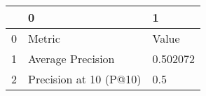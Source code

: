 \begin{tabular}{lll}
\toprule
{} &                       0 &         1 \\
\midrule
0 &                  Metric &     Value \\
1 &       Average Precision &  0.502072 \\
2 &  Precision at 10 (P@10) &       0.5 \\
\bottomrule
\end{tabular}
